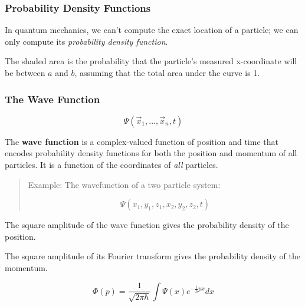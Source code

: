 \documentclass{beamer}
\begin{document}
\begin{frame}
\frametitle{Probability Density Functions}

\begin{center}
In quantum mechanics, we can't compute the exact location of a particle;
we can only compute its {\it probability density function}.

\vskip 12pt


The shaded area is the probability that the particle's measured x-coordinate will be between $a$ and $b$,
assuming that the total area under the curve is 1.
\end{center}

\end{frame}

\def\argt{(\vec{x}_1,...,\vec{x}_n,t)}
\def\arg{(\vec{x}_1,...,\vec{x}_n)}

\begin{frame}
\frametitle{The Wave Function}
\[ \Psi\argt \]

The {\bf wave function} is a complex-valued function of position and time that encodes
probability density functions for both the position and momentum of all particles.
It is a function of the coordinates of {\it all} particles.

\vskip 12pt
\begin{quotation}
Example: The wavefunction of a two particle system:

\[ \Psi(x_1,y_1,z_1,x_2,y_2,z_2,t) \]
\end{quotation}

The square amplitude of the wave function gives the probability density of the position.

The square amplitude of its Fourier transform gives the probability density of the momentum.

\[ \Phi(p) = \frac{1}{\sqrt{2\pi\hbar}}\int \Psi(x)e^{-\frac{i}{\hbar}px}dx \]
\end{frame}
\end{document}
